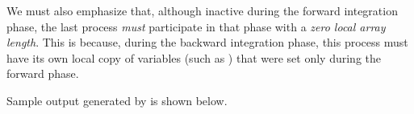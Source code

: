 We must also emphasize that, although inactive during the forward integration phase, 
the last process {\em must} participate in that phase with a 
{\em zero local array length}. 
This is because, during the backward integration phase, this process must
have its own local copy of variables (such as ) that were set
only during the forward phase.

Sample output generated by  is shown below.
{\small}
